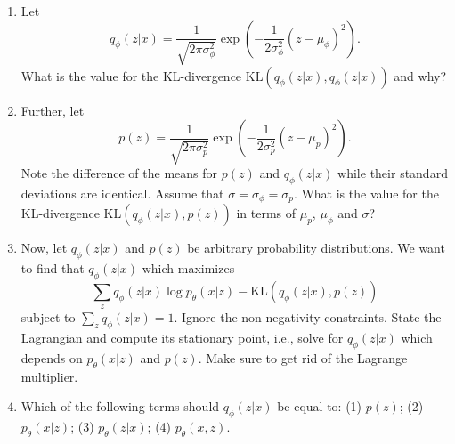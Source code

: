 \begin{Q}
\begin{enumerate}
		
		\item Let
		$$
		q_{\phi}(z|x) = \frac{1}{\sqrt{2\pi\sigma_{\phi}^2}} \exp\left(-\frac{1}{2\sigma_{\phi}^2}(z - \mu_{\phi})^2\right).
		$$
		What is the value for the KL-divergence $\text{KL}(q_{\phi}(z|x), q_{\phi}(z|x))$ and why?
		\item Further, let
		$$
		p(z) =  \frac{1}{\sqrt{2\pi\sigma_{p}^2}} \exp\left(-\frac{1}{2\sigma_{p}^{2}}(z - \mu_p)^2\right).
		$$
		Note the difference of the means for $p(z)$ and $q_{\phi}(z|x)$ while their standard deviations are identical. Assume that $\sigma=\sigma_{\phi}=\sigma_{p}$. What is the value for the KL-divergence $\text{KL}(q_{\phi}(z|x), p(z))$ in terms of $\mu_p$, $\mu_{\phi}$ and $\sigma$?
		
		\item Now, let $q_{\phi}(z|x)$ and $p(z)$ be  arbitrary probability distributions. We want to find that $q_{\phi}(z|x)$ which maximizes 
		$$
		\sum_z q_{\phi}(z|x)\log p_\theta(x|z) - \text{KL}(q_{\phi}(z|x), p(z))	
		$$
		subject to $\sum_z q_{\phi}(z|x) = 1$. Ignore the non-negativity constraints. State the Lagrangian and compute its stationary point, i.e., solve for $q_{\phi}(z|x)$ which depends on $p_\theta(x|z)$ and $p(z)$. Make sure to get rid of the Lagrange multiplier.
		\item Which of the following terms should $q_{\phi}(z|x)$ be equal to: 
		(1) $p(z)$; (2) $p_\theta(x|z)$; (3) $p_\theta(z|x)$; (4) $p_\theta(x, z)$.
	\end{enumerate}
\end{Q}


